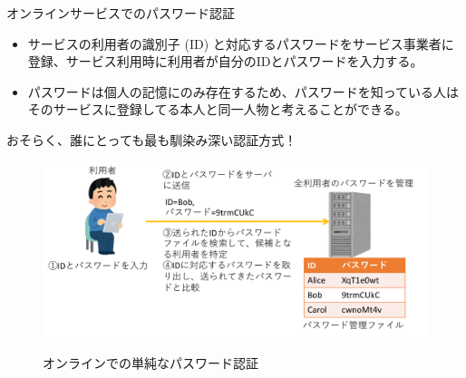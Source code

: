 \documentclass[12pt,dvipdfmx,uplatex]{beamer}
\begin{document}
\begin{frame}{オンラインサービスでのパスワード認証}
\begin{itemize}
\item サービスの利用者の識別子 (ID) と対応するパスワードをサービス事業者に登録、サービス利用時に利用者が自分のIDとパスワードを入力する。
\item パスワードは個人の記憶にのみ存在するため、\alert{パスワードを知っている人はそのサービスに登録してる本人と同一人物}と考えることができる。
\end{itemize}

\begin{center}
おそらく、誰にとっても最も馴染み深い認証方式！ 
\end{center}

\end{frame}

\begin{frame}
\begin{figure}
\centering
\includegraphics[width=\linewidth]{Figs/password-auth.pdf}\\
\caption{オンラインでの単純なパスワード認証}
\end{figure}
\end{frame}
\end{document}
